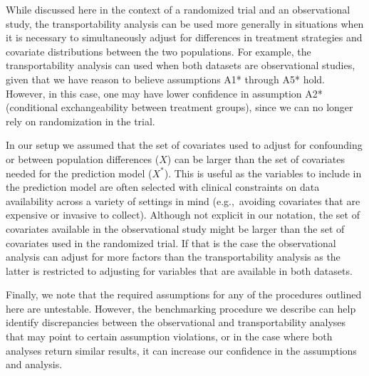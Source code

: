 \documentclass[11pt]{article}
\begin{document}
While discussed here in the context of a randomized trial and an observational study, the transportability analysis can be used more generally in situations when it is necessary to  simultaneously adjust for differences in treatment strategies and covariate distributions between the two populations. For example, the transportability analysis can used when both datasets are observational studies, given that we have reason to believe assumptions A1* through A5* hold. However, in this case, one may have lower confidence in assumption A2* (conditional exchangeability between treatment groups), since we can no longer rely on randomization in the trial.  

In our setup we assumed that the set of covariates used to adjust for confounding or between population differences ($X$) can be larger than the set of covariates needed for the prediction model ($X^*$). This is useful as the variables to include in the prediction model are often selected with clinical constraints on data availability across a variety of settings in mind (e.g.,~avoiding covariates that are expensive or invasive to collect). Although not explicit in our notation, the set of covariates available in the observational study might be larger than the set of covariates used in the randomized trial. If that is the case the observational analysis can adjust for more factors than the transportability analysis as the latter is restricted to adjusting for variables that are available in both datasets.

Finally, we note that the required assumptions for any of the procedures outlined here are untestable. However, the benchmarking procedure we describe can help identify discrepancies between the observational and transportability analyses that may point to certain assumption violations, or in the case where both analyses return similar results, it can increase our confidence in the assumptions and analysis.
\end{document}
